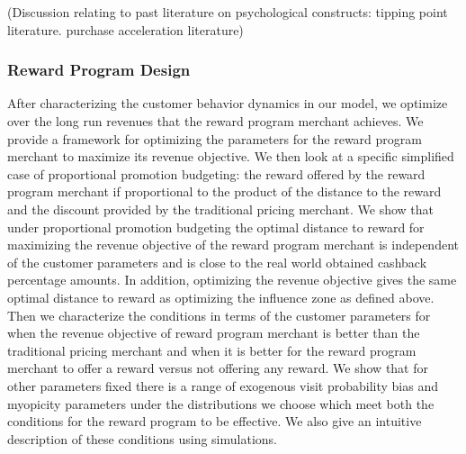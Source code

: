 {\arpit(Discussion relating to past literature on psychological constructs: tipping point literature. purchase acceleration literature)}

\subsubsection{Reward Program Design}
After characterizing the customer behavior dynamics in our model, we optimize over the long run revenues that the reward program merchant achieves.
We provide a framework for optimizing the parameters for the reward program merchant to maximize its revenue objective.
We then look at a specific simplified case of proportional promotion budgeting: the reward offered by the reward program merchant if proportional to the product of the distance to the reward and the discount provided by the traditional pricing merchant.
We show that under proportional promotion budgeting the optimal distance to reward for maximizing the revenue objective of the reward program merchant is independent of the customer parameters and is close to the real world obtained cashback percentage amounts.
In addition, optimizing the revenue objective gives the same optimal distance to reward as optimizing the influence zone as defined above.
Then we characterize the conditions in terms of the customer parameters for when the revenue objective of reward program merchant is better than the traditional pricing merchant and when it is better for the reward program merchant to offer a reward versus not offering any reward.
We show that for other parameters fixed there is a range of exogenous visit probability bias and myopicity parameters under the distributions we choose which meet both the conditions for the reward program to be effective.
We also give an intuitive description of these conditions using simulations.

